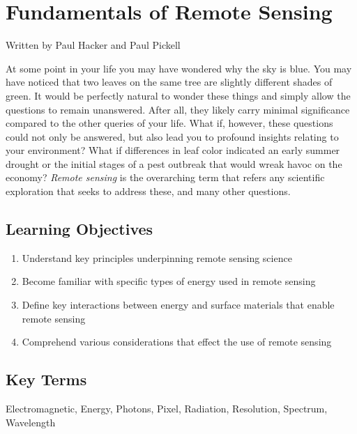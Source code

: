 \documentclass[
]{book}
\providecommand{\tightlist}{%
  \setlength{\itemsep}{0pt}\setlength{\parskip}{0pt}}
\begin{document}
\hypertarget{fundamentals-of-remote-sensing}{%
\chapter{Fundamentals of Remote Sensing}\label{fundamentals-of-remote-sensing}}

Written by
Paul Hacker and Paul Pickell

At some point in your life you may have wondered why the sky is blue.
You may have noticed that two leaves on the same tree are slightly
different shades of green. It would be perfectly natural to wonder these
things and simply allow the questions to remain unanswered. After all,
they likely carry minimal significance compared to the other queries of
your life. What if, however, these questions could not only be answered,
but also lead you to profound insights relating to your environment?
What if differences in leaf color indicated an early summer drought or
the initial stages of a pest outbreak that would wreak havoc on the
economy? \emph{Remote sensing} is the overarching term that refers any
scientific exploration that seeks to address these, and many other
questions.

\hypertarget{learning-objectives-10}{%
\section*{Learning Objectives}\label{learning-objectives-10}}

\begin{enumerate}
\def\labelenumi{\arabic{enumi}.}
\tightlist
\item
  Understand key principles underpinning remote sensing science
\item
  Become familiar with specific types of energy used in remote sensing
\item
  Define key interactions between energy and surface materials that
  enable remote sensing
\item
  Comprehend various considerations that effect the use of remote sensing
\end{enumerate}

\hypertarget{key-terms-10}{%
\section*{Key Terms}\label{key-terms-10}}

Electromagnetic, Energy, Photons, Pixel, Radiation, Resolution,
Spectrum, Wavelength
\end{document}
